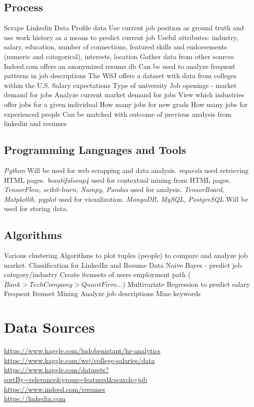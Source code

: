 \documentclass[12pt]{article}
\begin{document}
\subsection{Process}
\begin{outline}[enumerate]
\1 Scrape Linkedin Data
\2 Profile data
\2 Use current job position as ground truth and use work history as a means to predict current job
\2 Useful attributes: industry, salary, education, number of connections, featured skills and endorsements (numeric and categorical), interests, location
\1 Gather data from other sources
\2 Indeed.com offers an anonymized resume db
\3 Can be used to analyze frequent patterns in job descriptions 
\2 The WSJ offers a dataset with data from colleges within the U.S.
\3 Salary expectations
\3 Type of university
\2 Job openings - market demand for jobs
\3 Analyze current market demand for jobs
\3 View which industries offer jobs for a given individual
\4 How many jobs for new grads
\4 How many jobs for experienced people 
\4 Can be matched with outcome of previous analysis from linkedin and resumes
\end{outline}

\subsection{Programming Languages and Tools}
\begin{outline}
\1 \emph{Python} Will be used for web scrapping and data analysis.
\2 \emph{requests} used retrieving HTML pages.
\2 \emph{beautifulsoup4} used for contextual mining from HTML pages.
\2 \emph{TensorFlow, scikit-learn, Numpy, Pandas} used for analysis.
\2 \emph{TensorBoard, Matplotlib, pyplot} used for visualization.
\1 \emph{MongoDB, MySQL, PostgreSQL} Will be used for storing data.
\end{outline}


\subsection{Algorithms}
\begin{outline}[enumerate]
\1 Various clustering Algorithms to plot tuples (people) to compare and analyze job market.
\1 Classification for LinkedIn and Resume Data
\2 Naive Bayes - predict job category/industry
\2 Create itemsets of users employment path ($Bank > Tech Company > Quant Firm$...)
\2 Multivariate Regression to predict salary
\1 Frequent Itemset Mining
\2 Analyze job descriptions
\2 Mine keywords
\end{outline}


\section{Data Sources}
\url{https://www.kaggle.com/ludobenistant/hr-analytics} \\
\url{https://www.kaggle.com/wsj/college-salaries/data} \\
\url{https://www.kaggle.com/datasets?sortBy=relevance&group=featured&search=job} \\
\url{https://www.indeed.com/resumes} \\
\url{https://linkedin.com} \\
\end{document}
